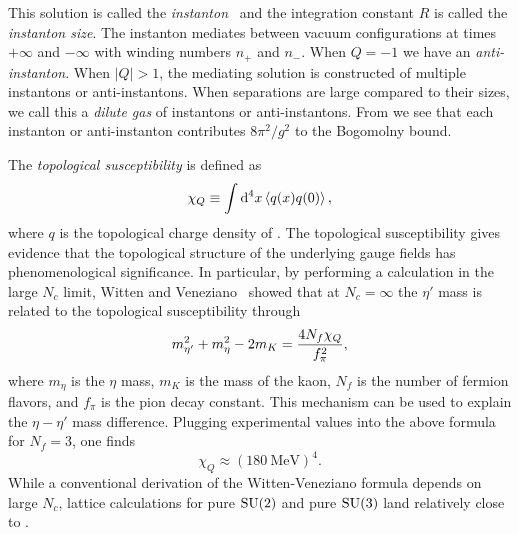This solution is called the {\it instanton}~\cite{belavin_pseudoparticle_1975}
and the integration constant $R$ is called the 
{\it instanton size}. 
The instanton mediates between vacuum configurations at times
$+\infty$ and $-\infty$ with winding numbers $n_+$ and $n_-$.
When $Q=-1$ we have an {\it anti-instanton}.
When $|Q|>1$, the mediating solution is constructed of multiple 
instantons or anti-instantons. When separations are large compared
to their sizes, we call this a {\it dilute gas} of instantons
or anti-instantons. From 
we see that each instanton or anti-instanton contributes
$8\pi^2/g^2$ to the Bogomolny bound.

The {\it topological susceptibility} is defined as
\begin{equation}
  \chi_Q\equiv\int\dd[4]{x}\ev{q(x)q(0)},
\end{equation}
where $q$ is the topological charge density of .
The topological susceptibility gives evidence that the topological
structure of the underlying gauge fields has phenomenological significance.
In particular, by performing a calculation in the large $N_c$ limit, 
Witten and Veneziano~\cite{witten_current_1979,veneziano_u1_1979} showed
that at $N_c=\infty$ the $\eta'$ mass is related to 
the topological susceptibility through
\begin{equation}\index{Witten-Veneziano formula}
  m_{\eta'}^2+m_\eta^2-2m_K=\frac{4N_f\chi_Q}{f_\pi^2},
\end{equation}
where $m_\eta$ is the $\eta$ mass, $m_K$ is the mass of the kaon, 
$N_f$ is the number of fermion flavors, and $f_\pi$ is the
pion decay constant. This mechanism can be used to explain the 
$\eta-\eta'$ mass difference. 
Plugging experimental values into the above
formula for $N_f=3$, one finds
\begin{equation}\label{eq:chivalue}
  \chi_Q\approx(180~\text{MeV})^4.
\end{equation}
While a conventional derivation of the Witten-Veneziano formula depends
on large $N_c$, lattice calculations for pure $\operatorname{SU}(2)$ and
pure $\operatorname{SU}(3)$ land relatively close to .







